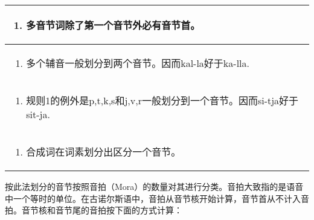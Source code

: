\begin{longtable}{l}
  \toprule
  \begin{enumerate}\def\labelenumi{\arabic{enumi}.}\item  多音节词除了第一个音节外必有音节首。\end{enumerate} \\
  \midrule
  \endhead
  \bottomrule
  \endfoot
  \begin{minipage}[t]{\linewidth}\raggedright
    \begin{enumerate}
      \def\labelenumi{\arabic{enumi}.}
      \setcounter{enumi}{1}
      \item
            多个辅音一般划分到两个音节。因而kal-la好于ka-lla.
    \end{enumerate}
  \end{minipage}                                                        \\
  \begin{minipage}[t]{\linewidth}\raggedright
    \begin{enumerate}
      \def\labelenumi{\arabic{enumi}.}
      \setcounter{enumi}{2}
      \item
            规则1的例外是p,t,k,s和j,v,r一般划分到一个音节。因而si-tja好于sit-ja.
    \end{enumerate}
  \end{minipage}                                                        \\
  \begin{minipage}[t]{\linewidth}\raggedright
    \begin{enumerate}
      \def\labelenumi{\arabic{enumi}.}
      \setcounter{enumi}{3}
      \item
            合成词在词素划分出区分一个音节。
    \end{enumerate}
  \end{minipage}                                                        \\
\end{longtable}

按此法划分的音节按照音拍（Mora）的数量对其进行分类。音拍大致指的是语音中一个等时的单位。在古诺尔斯语中，音拍从音节核开始计算，音节首从不计入音拍。音节核和音节尾的音拍按下面的方式计算：

